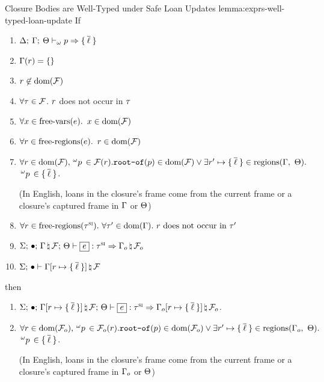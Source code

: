 \begin{oxlemma}{Closure Bodies are Well-Typed under Safe Loan Updates}
  {lemma:exprs-well-typed-loan-update}
  If
  \begin{enumerate}
  \item $\Delta; \: \Gamma; \: \Theta \vdash_{\omega} p \Rightarrow 
    \{ \: \overline{\ell} \: \}
  $
  \item $\Gamma(r) = \{\}$
  \item $r \not \in \textrm{dom}(\mathcal{F})$
  \item $\forall \tau \in \mathcal{F}$. $r$ does not occur in $\tau$
  \item $\forall x \in \textrm{free-vars}(e).$ $x \in \textrm{dom}(\mathcal{F})$
  \item $\forall r \in \textrm{free-regions}(e).$ $r \in \textrm{dom}(\mathcal{F})$
  \item $\forall r \in \textrm{dom}(\mathcal{F}),
    \,^{\omega}p\, \in \mathcal{F}(r).
    \texttt{root-of}(p) \in \textrm{dom}(\mathcal{F}) \vee
    \exists r^\prime \mapsto \{ \: \overline{\ell} \: \} \in
    \textrm{regions}(\Gamma,\ \Theta).$ $\,^{\omega}p\, \in \{ \: \overline{\ell} \: \}$.
    
    (In English, loans in the closure's frame come from the current frame or a closure's captured
    frame in $\Gamma$ or $\Theta$)
  \item $\forall r \in \textrm{free-regions}(\tau^\textsc{si}).\ \forall \tau^\prime \in
    \textrm{dom}(\Gamma).\ r\text{ does not occur in }\tau^\prime$
  \item $\oxtypjudge{\oxglobalctx}{\oxemptyctx}{\oxkontctx}{\oxnewframe{\oxvarctx}{\oxframe}}
    {\oxexpr}{\oxsitype}{\oxnewframe{\oxvarctx_o}{\oxframe_o}}$
  \item $\Sigma; \, \bullet \vdash 
      \Gamma[r \mapsto \{ \: \overline{\ell} \: \}]
     \, \natural \, \mathcal{F}$
  \end{enumerate}
  then
  \begin{enumerate}
  \item $\oxtypjudge{\oxglobalctx}{\oxemptyctx}{\oxkontctx}{
    \oxnewframe{
      \oxupdate{\oxvarctx}{
        \oxloanctxentry{\oxcprov}{ \oxset{\overline{\oxloan}} }
      }
    }{\oxframe}
  }{\oxexpr}{\oxsitype}{
    \oxnewframe{
      \oxupdate{\oxvarctx_o}{
        \oxloanctxentry{\oxcprov}{\oxset{\overline{\oxloan}}
        }
      }
    }{\oxframe_o}
  }$.
  \item $\forall r \in \textrm{dom}(\mathcal{F}_o),
    \,^{\omega}p\, \in \mathcal{F}_o(r).
    \texttt{root-of}(p) \in \textrm{dom}(\mathcal{F}_o) \vee
    \exists r^\prime \mapsto \{ \: \overline{\ell} \: \} \in
    \textrm{regions}(\Gamma_o,\ \Theta).$ $\,^{\omega}p\, \in \{ \: \overline{\ell} \: \}$.
    
    (In English, loans in the closure's frame come from the current frame or a closure's captured
    frame in $\Gamma_o$ or $\Theta$)
  \end{enumerate}
\end{oxlemma}

